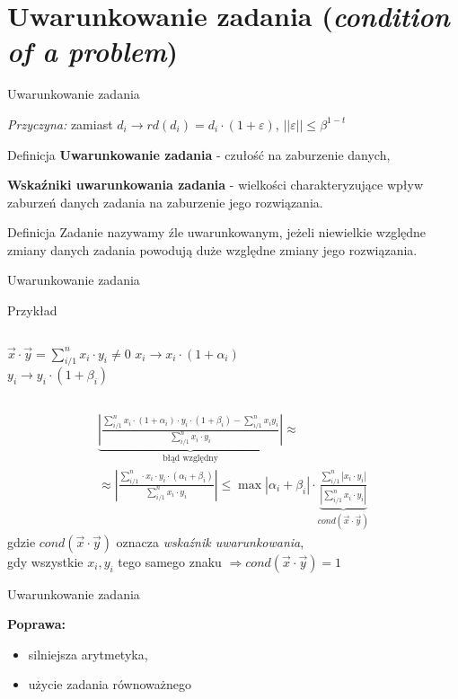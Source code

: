 \section{Uwarunkowanie zadania ({\it condition of a problem})}
\begin{frame}{Uwarunkowanie zadania}

	{\it Przyczyna:} zamiast 
    	$d_i \rightarrow rd(d_i) = d_i \cdot (1 + \varepsilon)$,
        $||\varepsilon|| \le \beta^{1-t}$
        
    \begin{block}{Definicja}
    	{\bf Uwarunkowanie zadania} - czułość na zaburzenie danych,
        
        {\bf Wskaźniki uwarunkowania zadania} - wielkości charakteryzujące wpływ zaburzeń danych zadania na zaburzenie jego rozwiązania.
    \end{block}
    
    \begin{block}{Definicja}
    Zadanie nazywamy źle uwarunkowanym, jeżeli niewielkie względne zmiany danych zadania powodują duże względne zmiany jego rozwiązania.
    \end{block}
\end{frame}
\begin{frame}{Uwarunkowanie zadania}
	\begin{exampleblock}{Przykład}
    \begin{columns}
        	\centering
            $\vec{x} \cdot \vec{y} = \sum_{i/1}^n x_i \cdot y_i \neq 0$
                $x_i \rightarrow x_i \cdot (1 + \alpha_i)$ \\
                $y_i \rightarrow y_i \cdot (1 + \beta_i)$
    \end{columns}
    \begin{gather*}
    	\underbrace{\left| \frac{
        	\sum_{i/1}^n x_i \cdot (1 + \alpha_i) \cdot y_i \cdot (1 + \beta_i) - \sum_{i/1}^n x_i y_i
        }{
        	\sum_{i/1}^n x_i \cdot y_i
        }\right|}_\text{błąd względny}
        \approx \\ \approx
        \left| \frac{
        	\sum_{i/1}^n \cdot x_i \cdot y_i \cdot \left( \alpha_i + \beta_i \right)
        }{
        	\sum_{i/1}^n x_i \cdot y_i
        }\right|
        \le
        \max \left| \alpha_i + \beta_i \right| \cdot \underbrace{\frac{
        	\sum_{i/1}^n \left| x_i \cdot y_i \right|
        }{
        	\left| \sum_{i/1}^n x_i \cdot y_i \right|
        }}_{cond(\vec{x} \cdot \vec{y})}
    \end{gather*}
    gdzie $cond(\vec{x} \cdot \vec{y})$ oznacza {\it wskaźnik uwarunkowania}, \\ 
    gdy wszystkie $x_i, y_i$ tego samego znaku $\Rightarrow cond(\vec{x} \cdot \vec{y}) = 1$
    \end{exampleblock}
\end{frame}
\begin{frame}{Uwarunkowanie zadania}

	{\bf Poprawa:}
    \begin{itemize}
    	\item silniejsza arytmetyka,
        \item użycie zadania równoważnego
    \end{itemize}
\end{frame}
